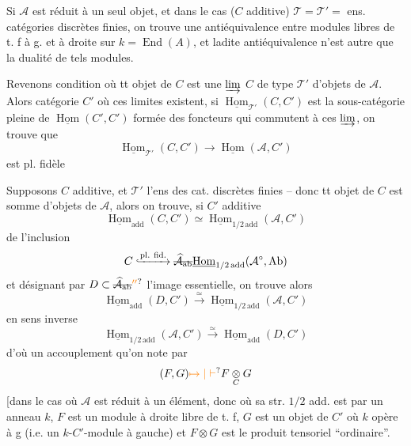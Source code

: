 Si $\mathcal A$ est réduit à un seul objet,  et
dans le cas  ($C$ additive)
$\mathcal T=\mathcal T'=$ ens. catégories discrètes finies,
on trouve une antiéquivalence
entre modules libres de t. f à g. et
à droite sur $k=\operatorname{End}(A)$, et ladite
antiéquivalence n'est autre que la
dualité de tels modules.

Revenons  condition où
tt objet de $C$ est une $\varinjlim$  $C$
de type $\mathcal T'$ d'objets de $\mathcal A$. Alors
 catégorie $C'$ où ces limites existent,
si $\underline{\operatorname{Hom}}_{\mathcal T'}(C,C')$ est la sous-catégorie
pleine de $\underline{\operatorname{Hom}}(C',C')$ formée des
foncteurs qui commutent à ces
$\varinjlim$, on trouve que
\[
 \underline{\operatorname{Hom}}_{\mathcal T'}(C,C')\longrightarrow\underline{\operatorname{Hom}}(\mathcal A,C')
\]
est pl. fidèle 

Supposons $C$ additive, et $\mathcal T'$ l'ens
des cat. discrètes finies -- donc
tt objet de $C$ est somme d'objets
de $\mathcal A$, alors on trouve, si $C'$ additive
\[
 \underline{\operatorname{Hom}}_{\mathrm{add}}(C,C')\simeq
 \underline{\operatorname{Hom}}_{1/2\,\mathrm{add}}(\mathcal A,C')
\]
 de l'inclusion
\[
 C\lhook\joinrel\xrightarrow{\mathrm{pl.\ fid.}}
 \deleted{\widehat{\mathcal A}_{\mathrm{ab}}}
 \underline{\operatorname{Hom}}_{1/2\,\mathrm{add}}(\mathcal A^\circ,\mathrm{Ab})
\]
et désignant par $D\subset\deleted{\widehat{\mathcal A}_{\mathrm{ab}}}\unsure{''}$ l'image
essentielle, on trouve alors
\[
 \underline{\operatorname{Hom}}_{\mathrm{add}}(D,C')\xrightarrow{\simeq}
 \underline{\operatorname{Hom}}_{1/2\,\mathrm{add}}(\mathcal A,C')
\]
 en sens inverse
\[
 \underline{\operatorname{Hom}}_{1/2\,\mathrm{add}}(\mathcal A,C')\xrightarrow{\simeq}
 \underline{\operatorname{Hom}}_{\mathrm{add}}(D,C')
\]
d'où un accouplement
qu'on note par 
\[
 (F,G)\unsure{\mapsto|\vdash} F\underset{C}{\otimes}G
\]
[dans le cas où $\mathcal A$ est réduit à un
élément, donc où sa str. $1/2$ add. est
 par un anneau $k$,
$F$ est un module à droite libre de
t. f, $G$ est un objet de $C'$ où $k$
opère à g (i.e. un $k$-$C'$-module
à gauche) et $F\otimes G$ est le
produit tensoriel ``ordinaire''.

